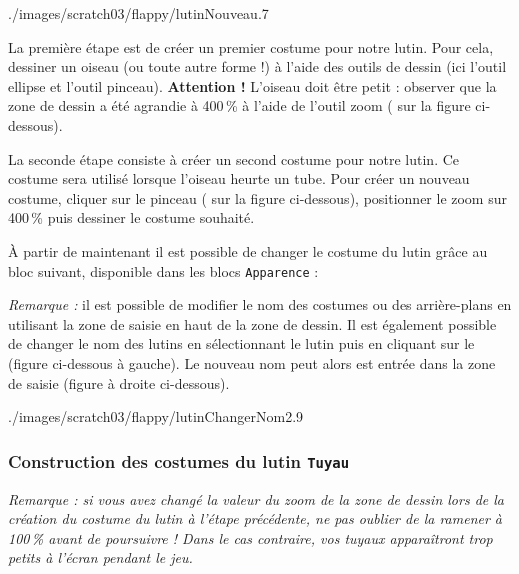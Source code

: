 %
	      {./images/scratch03/flappy/lutinNouveau}{.7\textwidth}

La première étape est de créer un premier costume pour notre lutin. Pour cela, dessiner un oiseau (ou toute autre forme !) à l'aide des outils de dessin (ici l'outil ellipse et l'outil pinceau). \textbf{Attention !} L'oiseau doit être petit : observer que la zone de dessin a été agrandie à 400\,\% à l'aide de l'outil zoom ( sur la figure ci-dessous).





La seconde étape consiste à créer un second costume pour notre lutin. Ce costume sera utilisé lorsque l'oiseau heurte un tube. Pour créer un nouveau costume, cliquer sur le pinceau ( sur la figure ci-dessous), positionner le zoom sur 400\,\% puis dessiner le costume souhaité. 



À partir de maintenant il est possible de changer le costume du lutin grâce au bloc suivant, disponible dans les blocs \texttt{Apparence} :



\emph{Remarque :} il est possible de modifier le nom des costumes ou des arrière-plans en utilisant la zone de saisie en haut de la zone de dessin. Il est également possible de changer le nom des lutins en sélectionnant le lutin puis en cliquant sur le  (figure ci-dessous à gauche). Le nouveau nom peut alors est entrée dans la zone de saisie (figure à droite ci-dessous).

%
	      {./images/scratch03/flappy/lutinChangerNom2}{.9\textwidth}


\subsubsection{Construction des costumes du lutin \texttt{Tuyau}}\label{costumesLutinTuyau} 

\emph{Remarque : si vous avez changé la valeur du zoom de la zone de dessin lors de la création du costume du lutin à l'étape précédente, ne pas oublier de la ramener à 100\,\% avant de poursuivre ! Dans le cas contraire, vos tuyaux apparaîtront trop petits à l'écran pendant le jeu.}

